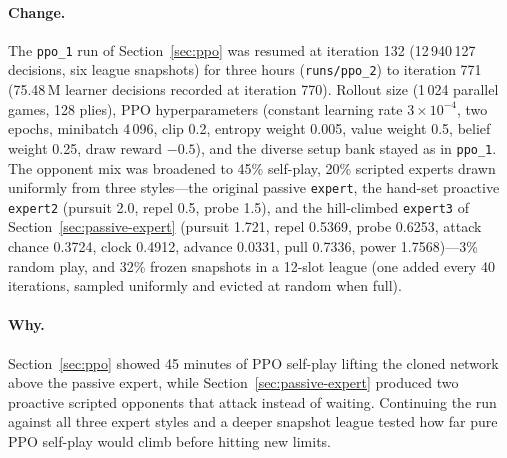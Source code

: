 \paragraph{Change.} The \texttt{ppo\_1} run of Section~\ref{sec:ppo} was resumed at iteration 132
(12\,940\,127 decisions, six league snapshots) for three hours (\texttt{runs/ppo\_2}) to iteration
771 (75.48\,M learner decisions recorded at iteration 770). Rollout size (1\,024 parallel games,
128 plies), PPO hyperparameters (constant learning rate $3 \times 10^{-4}$, two epochs, minibatch
4\,096, clip 0.2, entropy weight 0.005, value weight 0.5, belief weight 0.25, draw reward $-0.5$),
and the diverse setup bank stayed as in \texttt{ppo\_1}. The opponent mix was broadened to 45\%
self-play, 20\% scripted experts drawn uniformly from three styles---the original passive
\texttt{expert}, the hand-set proactive \texttt{expert2} (pursuit 2.0, repel 0.5, probe 1.5), and
the hill-climbed \texttt{expert3} of Section~\ref{sec:passive-expert} (pursuit 1.721, repel 0.5369,
probe 0.6253, attack chance 0.3724, clock 0.4912, advance 0.0331, pull 0.7336, power 1.7568)---3\%
random play, and 32\% frozen snapshots in a 12-slot league (one added every 40 iterations, sampled
uniformly and evicted at random when full).

\paragraph{Why.} Section~\ref{sec:ppo} showed 45 minutes of PPO self-play lifting the cloned
network above the passive expert, while Section~\ref{sec:passive-expert} produced two proactive
scripted opponents that attack instead of waiting. Continuing the run against all three expert
styles and a deeper snapshot league tested how far pure PPO self-play would climb before hitting
new limits.

